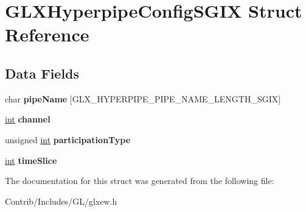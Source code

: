 \hypertarget{struct_g_l_x_hyperpipe_config_s_g_i_x}{}\section{G\+L\+X\+Hyperpipe\+Config\+S\+G\+IX Struct Reference}
\label{struct_g_l_x_hyperpipe_config_s_g_i_x}
\subsection*{Data Fields}
\begin{DoxyCompactItemize}
\item 
char {\bfseries pipe\+Name} \mbox{[}G\+L\+X\+\_\+\+H\+Y\+P\+E\+R\+P\+I\+P\+E\+\_\+\+P\+I\+P\+E\+\_\+\+N\+A\+M\+E\+\_\+\+L\+E\+N\+G\+T\+H\+\_\+\+S\+G\+IX\mbox{]}\hypertarget{struct_g_l_x_hyperpipe_config_s_g_i_x_accd4726a34638a32d105c6b9410837d3}{}\label{struct_g_l_x_hyperpipe_config_s_g_i_x_accd4726a34638a32d105c6b9410837d3}

\item 
\hyperlink{_s_d_l__thread_8h_a6a64f9be4433e4de6e2f2f548cf3c08e}{int} {\bfseries channel}\hypertarget{struct_g_l_x_hyperpipe_config_s_g_i_x_adf7dff2c57c0da9a4a2b70e3e815be31}{}\label{struct_g_l_x_hyperpipe_config_s_g_i_x_adf7dff2c57c0da9a4a2b70e3e815be31}

\item 
unsigned \hyperlink{_s_d_l__thread_8h_a6a64f9be4433e4de6e2f2f548cf3c08e}{int} {\bfseries participation\+Type}\hypertarget{struct_g_l_x_hyperpipe_config_s_g_i_x_adf3a9d68e2ebd7c20ef50130b99be3ab}{}\label{struct_g_l_x_hyperpipe_config_s_g_i_x_adf3a9d68e2ebd7c20ef50130b99be3ab}

\item 
\hyperlink{_s_d_l__thread_8h_a6a64f9be4433e4de6e2f2f548cf3c08e}{int} {\bfseries time\+Slice}\hypertarget{struct_g_l_x_hyperpipe_config_s_g_i_x_a4e0ec16a392cd0de59a6d2b23b719a92}{}\label{struct_g_l_x_hyperpipe_config_s_g_i_x_a4e0ec16a392cd0de59a6d2b23b719a92}

\end{DoxyCompactItemize}


The documentation for this struct was generated from the following file\+:\begin{DoxyCompactItemize}
\item 
Contrib/\+Includes/\+G\+L/glxew.\+h\end{DoxyCompactItemize}
